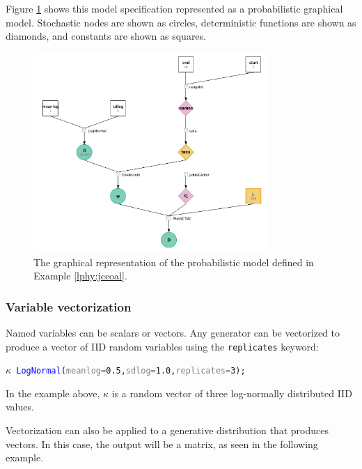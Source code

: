 \documentclass[10pt,letterpaper,table]{article}
\theoremstyle{definition}
\begin{document}
Figure \ref{fig:jccoalPGM} shows this model specification represented as a probabilistic graphical model. 
Stochastic nodes are shown as circles, deterministic functions are shown as diamonds, and constants are shown as squares.


\begin{figure}
   \includegraphics[width=0.8\textwidth]{figs_plos/Fig1.png}
  \caption{The graphical representation of the probabilistic model defined in Example \ref{lphy:jccoal}.} 
  \label{fig:jccoalPGM}
\end{figure}

\subsubsection{Variable vectorization}

Named variables can be scalars or vectors. 
Any generator can be vectorized to produce a vector of IID random variables using the \texttt{replicates} keyword:

{\small
\begin{alltt}
    \textcolor{bluishgreen}{\(\kappa\)} ~ \textcolor{blue}{LogNormal}(\textcolor{gray}{meanlog=}\textcolor{constant}{0.5}, \textcolor{gray}{sdlog=}\textcolor{constant}{1.0}, \textcolor{gray}{replicates=}\textcolor{constant}{3});
\end{alltt}
}

In the example above, $\kappa$ is a random vector of three log-normally distributed IID values.

Vectorization can also be applied to a generative distribution that produces vectors. In this case, the output will be a matrix, as seen in the following example. 
\end{document}
